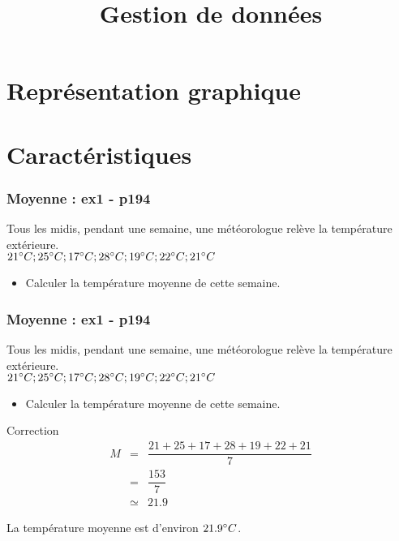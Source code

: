 \documentclass{beamer}
\title{Gestion de données}
\begin{document}
\frame{\titlepage}

\section{Représentation graphique}

\section{Caractéristiques}

\begin{frame}
  \frametitle{Moyenne : ex1 - p194}

  Tous les midis, pendant une semaine, une météorologue relève la température extérieure.\\
  $21 \degree C ; 25 \degree C ; 17 \degree C ; 28 \degree C ; 19 \degree C ; 22 \degree C ; 21 \degree C$
  
  \begin{itemize}
  \item Calculer la température moyenne de cette semaine.
  \end{itemize}

\end{frame}

\begin{frame}
  \frametitle{Moyenne : ex1 - p194}

  Tous les midis, pendant une semaine, une météorologue relève la température extérieure.\\
  $21 \degree C ; 25 \degree C ; 17 \degree C ; 28 \degree C ; 19 \degree C ; 22 \degree C ; 21 \degree C$
  
  \begin{itemize}
  \item Calculer la température moyenne de cette semaine.
  \end{itemize}

  \begin{exampleblock}{Correction}
    \begin{eqnarray*}
      M &=     & \dfrac{21+25+17+28+19+22+21}{7}\\
        &=     & \dfrac{153}{7}\\
        &\simeq& 21.9
    \end{eqnarray*}
    
    La température moyenne est d'environ $21.9 \degree C$.
  \end{exampleblock}
  
\end{frame}
\end{document}
